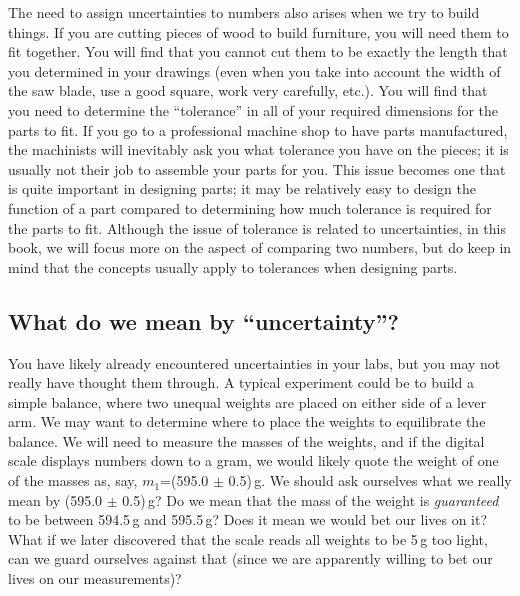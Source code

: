 The need to assign uncertainties to numbers also arises when we try to build things. If you are cutting pieces of wood to build furniture, you will need them to fit together. You will find that you cannot cut them to be exactly the length that you determined in your drawings (even when you take into account the width of the saw blade, use a good square, work very carefully, etc.). You will find that you need to determine the ``tolerance'' in all of your required dimensions for the parts to fit. If you go to a professional machine shop to have parts manufactured, the machinists will inevitably ask you what tolerance you have on the pieces; it is usually not their job to assemble your parts for you. This issue becomes one that is quite important in designing parts; it may be relatively easy to design the function of a part compared to determining how much tolerance is required for the parts to fit. Although the issue of tolerance is related to uncertainties, in this book, we will focus more on the aspect of comparing two numbers, but do keep in mind that the concepts usually apply to tolerances when designing parts.

\subsection{What do we mean by ``uncertainty''?}
You have likely already encountered uncertainties in your labs, but you may not really have thought them through. A typical experiment could be to build a simple balance, where two unequal weights are placed on either side of a lever arm. We may want to determine where to place the weights to equilibrate the balance. We will need to measure the masses of the weights, and if the digital scale displays numbers down to a gram, we would likely quote the weight of one of the masses as, say,  $m_1$=(595.0 $\pm$ 0.5)\,g. We should ask ourselves what we really mean by (595.0 $\pm$ 0.5)\,g? Do we mean that the mass of the weight is \textit{guaranteed} to be between 594.5\,g and 595.5\,g? Does it mean we would bet our lives on it? What if we later discovered that the scale reads all weights to be 5\,g too light, can we guard ourselves against that (since we are apparently willing to bet our lives on our measurements)?

